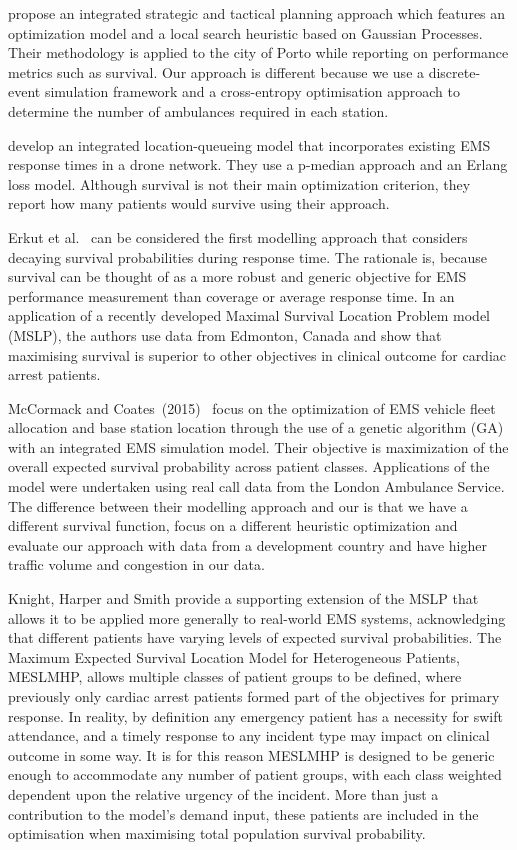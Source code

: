 \documentclass[preprint,12pt]{elsarticle}
\begin{document}
\FloatBarrier

\citet{amorim2019integrated} propose an integrated strategic and tactical
planning approach which features an optimization model and a local search
heuristic based on Gaussian Processes. Their methodology is applied to the
city of Porto while reporting on performance metrics such as survival. Our
approach is different because we use a discrete-event simulation framework and
a cross-entropy optimisation approach to determine the number of ambulances
required in each station. 

\citet{boutilier2022drone} develop an integrated location-queueing model that
incorporates existing EMS response times in a drone network. They use a
p-median approach and an Erlang loss model. Although survival is not their
main optimization criterion,  they report how many patients would survive
using their approach.

Erkut et al.~\cite{Erkut200842} can be considered the first modelling approach
that considers decaying survival probabilities during response time. The
rationale is, because survival can be thought of as a more robust and generic
objective for EMS performance measurement than coverage or average response
time. In an application of a recently developed Maximal Survival Location
Problem model (MSLP), the authors use data from Edmonton, Canada and show that
maximising survival is superior to other objectives in clinical outcome for
cardiac arrest patients.

McCormack and Coates~(2015)~\cite{MCormack2015} focus on the optimization of
EMS vehicle fleet allocation and base station location through the use of a
genetic algorithm (GA) with an integrated EMS simulation model. Their
objective is maximization of the overall expected survival probability across
patient classes. Applications of the model were undertaken using real call
data from the London Ambulance Service. The difference between their modelling
approach and our is that we have a different survival function, focus on a
different heuristic optimization and evaluate our approach with data from a
development country and have higher traffic volume and congestion in our data. 

Knight, Harper and Smith \cite{Knight2012918} provide a supporting extension
of the MSLP that allows it to be applied more generally to real-world EMS
systems, acknowledging that different patients have varying levels of expected
survival probabilities.  The Maximum Expected Survival Location Model for
Heterogeneous Patients, MESLMHP, allows multiple classes of patient groups to
be defined, where previously only cardiac arrest patients formed part of the
objectives for primary response. In reality, by definition any emergency
patient has a necessity for swift attendance, and a timely response to any
incident type may impact on clinical outcome in some way. It is for this
reason MESLMHP is designed to be generic enough to accommodate any number of
patient groups, with each class weighted dependent upon the relative urgency
of the incident.  More than just a contribution to the model’s demand input,
these patients are included in the optimisation when maximising total
population survival probability.
\end{document}
